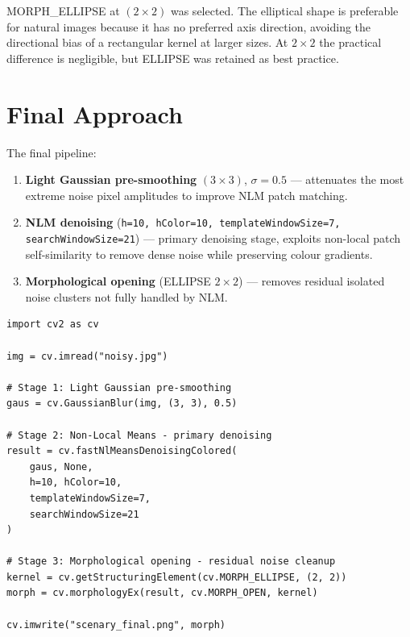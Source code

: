 \documentclass[journal]{IEEEtran}
\begin{document}
MORPH\_ELLIPSE at $(2\times2)$ was selected. The elliptical shape is preferable 
for natural images because it has no preferred axis direction, avoiding the 
directional bias of a rectangular kernel at larger sizes. At $2\times2$ the 
practical difference is negligible, but ELLIPSE was retained as best practice.

\section{Final Approach}
The final pipeline:

\begin{enumerate}
    \item \textbf{Light Gaussian pre-smoothing} $(3\times3)$, $\sigma=0.5$ — 
    attenuates the most extreme noise pixel amplitudes to improve NLM patch matching.
    \item \textbf{NLM denoising} (\texttt{h=10, hColor=10, templateWindowSize=7, 
    searchWindowSize=21}) — primary denoising stage, exploits non-local patch 
    self-similarity to remove dense noise while preserving colour gradients.
    \item \textbf{Morphological opening} (ELLIPSE $2\times2$) — removes residual 
    isolated noise clusters not fully handled by NLM.
\end{enumerate}

\begin{lstlisting}
import cv2 as cv

img = cv.imread("noisy.jpg")

# Stage 1: Light Gaussian pre-smoothing
gaus = cv.GaussianBlur(img, (3, 3), 0.5)

# Stage 2: Non-Local Means - primary denoising
result = cv.fastNlMeansDenoisingColored(
    gaus, None,
    h=10, hColor=10,
    templateWindowSize=7,
    searchWindowSize=21
)

# Stage 3: Morphological opening - residual noise cleanup
kernel = cv.getStructuringElement(cv.MORPH_ELLIPSE, (2, 2))
morph = cv.morphologyEx(result, cv.MORPH_OPEN, kernel)

cv.imwrite("scenary_final.png", morph)
\end{lstlisting}
\end{document}
